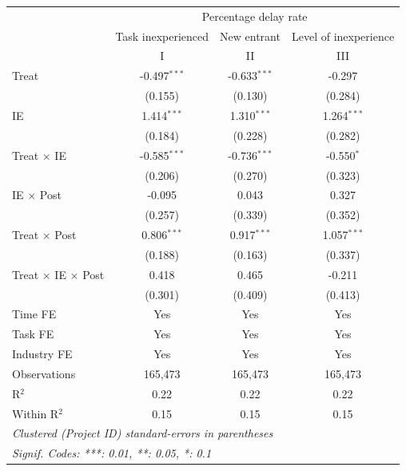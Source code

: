 \documentclass[
]{article}
\begin{document}
\begingroup
\centering
\small
\begin{tabular}{lccc}
   \toprule
    & \multicolumn{3}{c}{Percentage delay rate}\\
                                     & Task inexperienced & New entrant    & Level of inexperience \\   
                                     & I                  & II             & III\\  
   Treat                             & -0.497$^{***}$     & -0.633$^{***}$ & -0.297\\   
                                     & (0.155)            & (0.130)        & (0.284)\\   
   IE                                & 1.414$^{***}$      & 1.310$^{***}$  & 1.264$^{***}$\\   
                                     & (0.184)            & (0.228)        & (0.282)\\   
   Treat $\times$ IE                 & -0.585$^{***}$     & -0.736$^{***}$ & -0.550$^{*}$\\   
                                     & (0.206)            & (0.270)        & (0.323)\\   
   IE $\times$ Post                  & -0.095             & 0.043          & 0.327\\   
                                     & (0.257)            & (0.339)        & (0.352)\\   
   Treat $\times$ Post               & 0.806$^{***}$      & 0.917$^{***}$  & 1.057$^{***}$\\   
                                     & (0.188)            & (0.163)        & (0.337)\\   
   Treat $\times$ IE $\times$ Post   & 0.418              & 0.465          & -0.211\\   
                                     & (0.301)            & (0.409)        & (0.413)\\   
   Time FE                           & Yes                & Yes            & Yes\\  
   Task FE                           & Yes                & Yes            & Yes\\  
   Industry FE                       & Yes                & Yes            & Yes\\  
   Observations                      & 165,473            & 165,473        & 165,473\\  
   R$^2$                             & 0.22               & 0.22           & 0.22\\  
   Within R$^2$                      & 0.15               & 0.15           & 0.15\\  
   \midrule
   \multicolumn{4}{l}{\emph{Clustered (Project ID) standard-errors in parentheses}}\\
   \multicolumn{4}{l}{\emph{Signif. Codes: ***: 0.01, **: 0.05, *: 0.1}}\\
\end{tabular}
\par\endgroup
\end{document}
